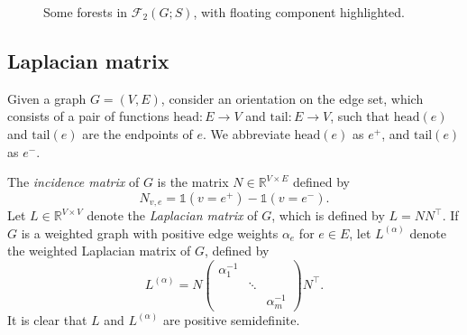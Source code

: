\documentclass{amsart}
\theoremstyle{definition}
\newcommand{\RR}{\mathbb{R}}
\newcommand{\one}{\mathds{1}}
\newcommand{\La}{L^{(\alpha)}}
\newcommand{\tr}{\intercal}
\newcommand{\forests}{\mathcal{F}}
\begin{document}
\begin{figure}[h]
%	
%
%
\caption{Some forests in $\forests_2(G;S)$, with floating component highlighted.}
\label{fig:2-forests}
\end{figure}


\subsection{Laplacian matrix}

Given a graph $G = (V,E)$, consider an orientation on the edge set, which consists of a pair of functions $\mathrm{head}: E \to V$ and $\mathrm{tail}: E \to V$, such that $\mathrm{head}(e)$ and $\mathrm{tail}(e)$ are the endpoints of $e$.
We abbreviate $\mathrm{head}(e)$ as $e^+$, and $\mathrm{tail}(e)$ as $e^-$.

The {\em incidence matrix} of $G$ is the matrix $N \in \RR^{V \times E}$ defined by
\[
	N_{v, e} = \one(v = e^+) - \one(v = e^-).
\]
Let $L \in \RR^{V \times V}$ denote the {\em Laplacian matrix} of $G$, which is defined by
$
	L = N N^\tr.
$
If $G$ is a weighted graph with positive edge weights $\alpha_e$ for $e \in E$,
let $\La$ denote the weighted Laplacian matrix of $G$,
defined by
\begin{equation}
\label{eq:weighted-laplacian}
	\La = N \begin{pmatrix}
	\alpha_1^{-1} & & \\
	& \ddots & \\
	& & \alpha_m^{-1}
	\end{pmatrix} N^\tr .
\end{equation}
It is clear that $L$ and $\La$ are positive semidefinite.
\end{document}
